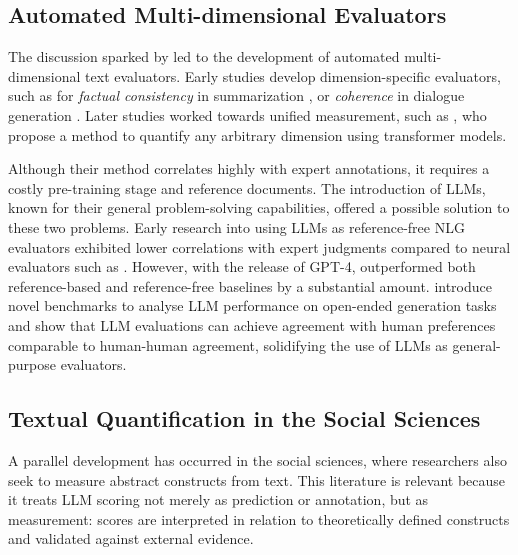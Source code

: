 \subsection{Automated Multi-dimensional Evaluators}

The discussion sparked by \citet{fabbri_summeval_2021} led to the development of automated multi-dimensional text evaluators. Early studies develop dimension-specific evaluators, such as for \textit{factual consistency} in summarization \citep{kryscinskiEvaluatingFactualConsistency2020, wangAskingAnsweringQuestions2020}, or \textit{coherence} in dialogue generation \citep{dziriEvaluatingCoherenceDialogue2019, yeQuantifiableDialogueCoherence2021}. Later studies worked towards unified measurement, such as \citet{zhongUnifiedMultiDimensionalEvaluator2022a}, who propose a method to quantify any arbitrary dimension using transformer models. 

Although their method correlates highly with expert annotations, it requires a costly pre-training stage and reference documents. The introduction of LLMs, known for their general problem-solving capabilities, offered a possible solution to these two problems. Early research into using LLMs as reference-free NLG evaluators \citep{fuGPTScoreEvaluateYou2023, wangChatGPTGoodNLG2023} exhibited lower correlations with expert judgments compared to neural evaluators such as \citet{zhongUnifiedMultiDimensionalEvaluator2022a}. However, with the release of GPT-4, \citet{liu_g-eval_2023} outperformed both reference-based and reference-free baselines by a substantial amount. \citet{zheng_judging_2023} introduce novel benchmarks to analyse LLM performance on open-ended generation tasks and show that LLM evaluations can achieve agreement with human preferences comparable to human-human agreement, solidifying the use of LLMs as general-purpose evaluators.
 

\subsection{Textual Quantification in the Social Sciences}

A parallel development has occurred in the social sciences, where researchers also seek to measure abstract constructs from text. This literature is relevant because it treats LLM scoring not merely as prediction or annotation, but as measurement: scores are interpreted in relation to theoretically defined constructs and validated against external evidence.

